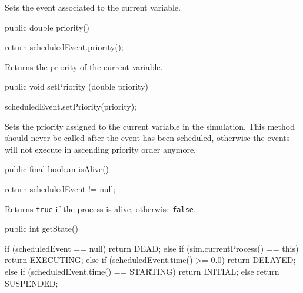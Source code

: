 \begin{tabb}  Sets the event associated to the current variable.
  \end{tabb}
\begin{htmlonly}
\end{htmlonly}
\begin{code}

   public double priority() \begin{hide} {
      return scheduledEvent.priority();
   } \end{hide}
\end{code}
\begin{tabb}
   Returns the priority of the current variable.
\end{tabb}
\begin{htmlonly}
\end{htmlonly}
\begin{code}

   public void setPriority (double priority) \begin{hide} {
      scheduledEvent.setPriority(priority);
   } \end{hide}
\end{code}
\begin{tabb}
   Sets the priority assigned to the current variable in the simulation.
   This method should never be called after the event has been scheduled, otherwise
   the events will not execute in ascending priority order anymore.
  \end{tabb}
\begin{htmlonly}
\end{htmlonly}
\begin{code}

   public final boolean isAlive() \begin{hide} {
      return scheduledEvent != null;
   } \end{hide}
\end{code}
  \begin{tabb} Returns \texttt{true} if the process is alive, otherwise \texttt{false}.
  \end{tabb}
\begin{htmlonly}
\end{htmlonly}
\begin{code}

   public int getState() \begin{hide} {
      if (scheduledEvent == null)                return DEAD;
      else if (sim.currentProcess() == this)             return EXECUTING;
      else if (scheduledEvent.time() >= 0.0)  return DELAYED;
      else if (scheduledEvent.time() == STARTING) return INITIAL;
      else return SUSPENDED;
   } \end{hide}
\end{code}
